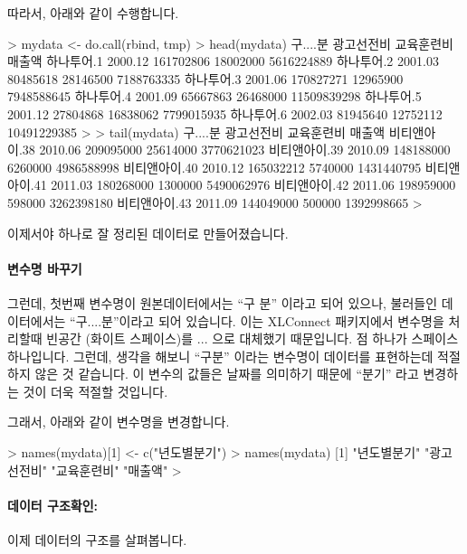 따라서, 아래와 같이 수행합니다. 

\begin{Schunk}
\begin{Soutput}
> mydata <- do.call(rbind, tmp)
> head(mydata)
           구....분 광고선전비 교육훈련비      매출액
하나투어.1  2000.12  161702806   18002000  5616224889
하나투어.2  2001.03   80485618   28146500  7188763335
하나투어.3  2001.06  170827271   12965900  7948588645
하나투어.4  2001.09   65667863   26468000 11509839298
하나투어.5  2001.12   27804868   16838062  7799015935
하나투어.6  2002.03   81945640   12752112 10491229385
> 
> tail(mydata)
              구....분 광고선전비 교육훈련비     매출액
비티앤아이.38  2010.06  209095000   25614000 3770621023
비티앤아이.39  2010.09  148188000    6260000 4986588998
비티앤아이.40  2010.12  165032212    5740000 1431440795
비티앤아이.41  2011.03  180268000    1300000 5490062976
비티앤아이.42  2011.06  198959000     598000 3262398180
비티앤아이.43  2011.09  144049000     500000 1392998665
> 
\end{Soutput}
\end{Schunk}

이제서야 하나로 잘 정리된 데이터로 만들어졌습니다.

\paragraph{변수명 바꾸기}
그런데, 첫번째 변수명이 원본데이터에서는 ``구    분'' 이라고 되어 있으나,  불러들인 데이터에서는 ``구....분''이라고 되어 있습니다. 
이는 XLConnect 패키지에서 변수명을 처리할때 빈공간 (화이트 스페이스)를 ... 으로 대체했기 때문입니다.
점 하나가 스페이스 하나입니다.
그런데, 생각을 해보니 ``구분'' 이라는 변수명이 데이터를 표현하는데 적절하지 않은 것 같습니다.
이 변수의 값들은 날짜를 의미하기 때문에 ``분기'' 라고 변경하는 것이 더욱 적절할 것입니다.

그래서, 아래와 같이 변수명을 변경합니다.

\begin{Schunk}
\begin{Soutput}
> names(mydata)[1] <- c("년도별분기")
> names(mydata)
[1] "년도별분기" "광고선전비" "교육훈련비" "매출액"    
> 
\end{Soutput}
\end{Schunk}

\paragraph{데이터 구조확인:}
이제 데이터의 구조를 살펴봅니다.

